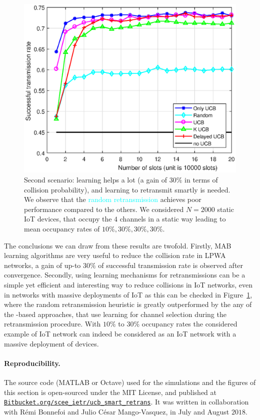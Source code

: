 \begin{figure}[h!]  %
	\centering
	\includegraphics[width=0.80\linewidth]{ResultsUCB2.eps}
	\caption[Second comparison between the exposed heuristics for the retransmission: ``Only \UCB'', ``Random'', ``\UCB'', ``$K$ \UCB'', and ``Delayed \UCB''.]{
		Second scenario: learning helps a lot (a gain of $30\%$ in terms of collision probability), and learning to retransmit smartly is needed.
		We observe that the \textcolor{cyan}{random retransmission} achieves poor performance compared to the others.
		We considered $N=2000$ static IoT devices, that occupy the $4$ channels in a static way leading to mean occupancy rates of $10\%,30\%,30\%,30\%$.
	}
	\label{fig:43:mainExperiment2}
\end{figure}

The conclusions we can draw from these results are twofold.
Firstly, MAB learning algorithms are very useful to reduce the collision rate in LPWA networks, a gain of up-to $30\%$ of successful transmission rate is observed after convergence.
Secondly, using learning mechanisms for retransmissions can be a simple yet efficient and interesting way to reduce collisions in IoT networks, even in networks with massive deployments of IoT as this can be checked in Figure~\ref{fig:43:mainExperiment2}, where the random retransmission heuristic is greatly outperformed by the any of the \UCB-based approaches, that use learning for channel selection during the retransmission procedure.
With $10\%$ to $30\%$ occupancy rates the considered example of IoT network can indeed be considered as an IoT network with a massive deployment of devices.


\paragraph{Reproducibility.}
%
The source code (MATLAB or Octave) used for the simulations and the figures of this section is open-sourced under the MIT License, and published at \href{https://Bitbucket.org/scee_ietr/ucb_smart_retrans}{\texttt{Bitbucket.org/scee\_ietr/ucb\_smart\_retrans}}.
It was written in collaboration with Rémi Bonnefoi and Julio César Mango-Vasquez, in July and August $2018$.
